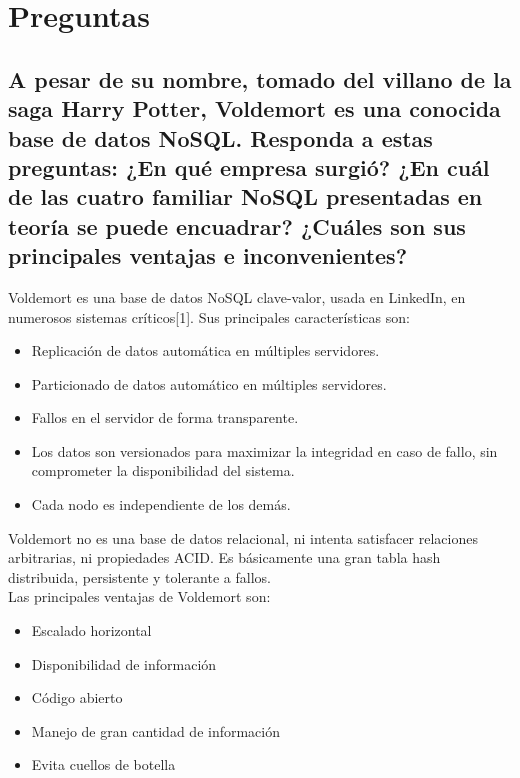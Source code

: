 \documentclass[12pt,a4paper,twoside,openright,titlepage,final]{article}
\author{José Ignacio Escribano}
\title{}
\begin{document}
\setcounter{page}{1}


\tableofcontents
\thispagestyle{empty}
\newpage

\setcounter{page}{1}


\section{Preguntas}

\subsection{A pesar de su nombre, tomado del villano de la saga Harry Potter, Voldemort es una conocida base de datos NoSQL. Responda a estas preguntas: ¿En qué empresa surgió? ¿En cuál de las cuatro familiar NoSQL presentadas en teoría se puede encuadrar? ¿Cuáles son sus principales ventajas e inconvenientes?}

Voldemort es una base de datos NoSQL clave-valor, usada en LinkedIn, en numerosos sistemas críticos[1]. Sus principales características son:

\begin{itemize}
	\item Replicación de datos automática en múltiples servidores.
	\item Particionado de datos automático en múltiples servidores.
	\item Fallos en el servidor de forma transparente.
	\item Los datos son versionados para maximizar la integridad en caso de fallo, sin comprometer la disponibilidad del sistema.
	\item Cada nodo es independiente de los demás.
\end{itemize}

Voldemort no es una base de datos relacional, ni intenta satisfacer relaciones arbitrarias, ni propiedades ACID. Es básicamente una gran tabla hash distribuida, persistente y tolerante a fallos.\\

Las principales ventajas de Voldemort son:

\begin{itemize}
	\item Escalado horizontal
	\item Disponibilidad de información
	\item Código abierto
	\item Manejo de gran cantidad de información
	\item Evita cuellos de botella
\end{itemize}
\end{document}
